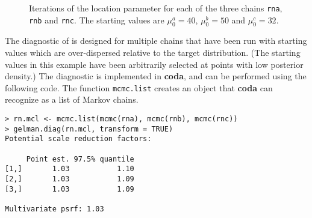 \documentclass[11pt,a4paper]{article}
\begin{document}
\begin{figure}
\begin{center}
\vspace{-1.5cm}
\hspace{0cm}
\hspace{0cm}
\end{center}
\caption{Iterations of the location parameter for each of the three chains \texttt{rna}, \texttt{rnb} and \texttt{rnc}. The starting values are $\mu_0^a=40$, $\mu_0^b=50$ and $\mu_0^c=32$.}
\label{locit}
\end{figure}

The diagnostic of \citet{gelmrubi92} is designed for multiple chains that have been run with starting values which are over-dispersed relative to the target distribution.
(The starting values in this example have been arbitrarily selected at points with low posterior density.)
The diagnostic is implemented in \textbf{coda}, and can be performed using the following code.
The function \verb+mcmc.list+ creates an object that \textbf{coda} can recognize as a list of Markov chains.


\begin{verbatim}
> rn.mcl <- mcmc.list(mcmc(rna), mcmc(rnb), mcmc(rnc))
> gelman.diag(rn.mcl, transform = TRUE)
Potential scale reduction factors:

     Point est. 97.5% quantile
[1,]       1.03           1.10
[2,]       1.03           1.09
[3,]       1.03           1.09

Multivariate psrf: 1.03
\end{verbatim}
\end{document}
